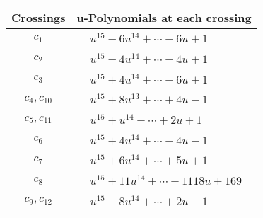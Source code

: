 \documentclass[1p]{elsarticle_modified}
\theoremstyle{definition}
\begin{document}
\begin{tabular}{m{50pt}|m{274pt}}
Crossings & \hspace{64pt}u-Polynomials at each crossing \\
\hline $$\begin{aligned}c_{1}\end{aligned}$$&$\begin{aligned}
&u^{15}-6 u^{14}+\cdots-6 u+1
\end{aligned}$\\
\hline $$\begin{aligned}c_{2}\end{aligned}$$&$\begin{aligned}
&u^{15}-4 u^{14}+\cdots-4 u+1
\end{aligned}$\\
\hline $$\begin{aligned}c_{3}\end{aligned}$$&$\begin{aligned}
&u^{15}+4 u^{14}+\cdots-6 u+1
\end{aligned}$\\
\hline $$\begin{aligned}c_{4},c_{10}\end{aligned}$$&$\begin{aligned}
&u^{15}+8 u^{13}+\cdots+4 u-1
\end{aligned}$\\
\hline $$\begin{aligned}c_{5},c_{11}\end{aligned}$$&$\begin{aligned}
&u^{15}+u^{14}+\cdots+2 u+1
\end{aligned}$\\
\hline $$\begin{aligned}c_{6}\end{aligned}$$&$\begin{aligned}
&u^{15}+4 u^{14}+\cdots-4 u-1
\end{aligned}$\\
\hline $$\begin{aligned}c_{7}\end{aligned}$$&$\begin{aligned}
&u^{15}+6 u^{14}+\cdots+5 u+1
\end{aligned}$\\
\hline $$\begin{aligned}c_{8}\end{aligned}$$&$\begin{aligned}
&u^{15}+11 u^{14}+\cdots+1118 u+169
\end{aligned}$\\
\hline $$\begin{aligned}c_{9},c_{12}\end{aligned}$$&$\begin{aligned}
&u^{15}-8 u^{14}+\cdots+2 u-1
\end{aligned}$\\
\hline
\end{tabular}\\~\\
\end{document}
